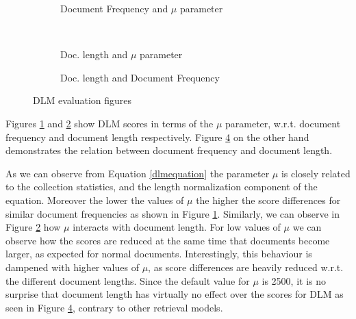 \begin{figure}
 		\begin{subfigure}[]{0.5\textwidth}
     	\caption{Document Frequency and $\mu$ parameter} 
    	
     	\label{dlmproofc2}
        \end{subfigure}
        ~
		\begin{subfigure}[]{0.5\textwidth}
           \caption{Doc. length and $\mu$ parameter}
           
           \label{dlmproofcc}          
        \end{subfigure}
        
		\begin{subfigure}[]{\textwidth}
          \caption{Doc. length and Document Frequency}
          
          \label{dlmproof}          
        \end{subfigure}

        \caption{DLM evaluation figures}
\end{figure}

Figures \ref{dlmproofc2} and \ref{dlmproofcc} show DLM scores in terms of the $\mu$ parameter, w.r.t. document frequency and document length respectively. Figure \ref{dlmproof} on the other hand demonstrates the relation between document frequency and document length.

As we can observe from Equation \ref{dlmequation} the parameter $\mu$ is closely related to the collection statistics, and the length normalization component of the equation. Moreover the lower the values of $\mu$ the higher the score differences for similar document frequencies as shown in Figure \ref{dlmproofc2}. Similarly, we can observe in Figure \ref{dlmproofcc} how $\mu$ interacts with document length. For low values of $\mu$ we can observe how the scores are reduced at the same time that documents become larger, as expected for normal documents. Interestingly, this behaviour is dampened with higher values of $\mu$, as score differences are heavily reduced w.r.t. the different document lengths. Since the default value for $\mu$ is 2500, it is no surprise that document length has virtually no effect over the scores for DLM as seen in Figure \ref{dlmproof}, contrary to other retrieval models. 

